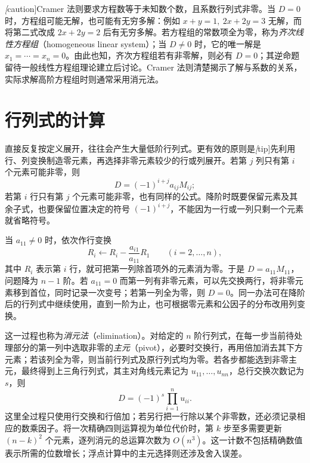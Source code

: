 \emph[caution]{Cramer 法则要求方程数等于未知数个数，且系数行列式非零}。当 $D=0$ 时，方程组可能无解，也可能有无穷多解：例如 $x+y=1,\ 2x+2y=3$ 无解，而将第二式改成 $2x+2y=2$ 后有无穷多解。若方程组的常数项全为零，称为\emph{齐次线性方程组}（homogeneous linear system）；当 $D\ne0$ 时，它的唯一解是 $x_1=\cdots=x_n=0$。由此也知，齐次方程组若有非零解，则必有 $D=0$；其逆命题留待一般线性方程组理论建立后讨论。Cramer 法则清楚揭示了解与系数的关系，实际求解高阶方程组时则通常采用消元法。

\section{行列式的计算}
\label{sec:determinant-computation}

直接反复按定义展开，往往会产生大量低阶行列式。更有效的原则是\emph[tip]{先利用行、列变换制造零元素，再选择非零元素较少的行或列展开}。若第 $j$ 列只有第 $i$ 个元素可能非零，则
\[
    D=(-1)^{i+j}a_{ij}M_{ij};
\]
若第 $i$ 行只有第 $j$ 个元素可能非零，也有同样的公式。降阶时既要保留元素及其余子式，也要保留位置决定的符号 $(-1)^{i+j}$，不能因为一行或一列只剩一个元素就省略符号。

当 $a_{11}\ne0$ 时，依次作行变换
\[
    R_i\longleftarrow R_i-\frac{a_{i1}}{a_{11}}R_1
    \qquad(i=2,\ldots,n),
\]
其中 $R_i$ 表示第 $i$ 行，就可把第一列除首项外的元素消为零。于是 $D=a_{11}M_{11}$，问题降为 $n-1$ 阶。若 $a_{11}=0$ 而第一列有非零元素，可以先交换两行，将非零元素移到首位，同时记录一次变号；若第一列全为零，则 $D=0$。同一办法可在降阶后的行列式中继续使用，直到一阶为止，也可根据零元素和公因子的分布改用列变换。

这一过程也称为\emph{消元法}（elimination）。对给定的 $n$ 阶行列式，在每一步当前待处理部分的第一列中选取非零的\emph{主元}（pivot），必要时交换行，再用倍加消去其下方元素；若该列全为零，则当前行列式及原行列式均为零。若各步都能选到非零主元，最终得到上三角行列式，其主对角线元素记为 $u_{11},\ldots,u_{nn}$，总行交换次数记为 $s$，则
\begin{equation}
\label{eq:determinant-elimination-product}
    D=(-1)^s\prod_{i=1}^{n}u_{ii}.
\end{equation}
这里全过程只使用行交换和行倍加；若另行把一行除以某个非零数，还必须记录相应的数乘因子。将一次精确四则运算视为单位代价时，第 $k$ 步至多需要更新 $(n-k)^2$ 个元素，逐列消元的总运算次数为 $O(n^3)$。这一计数不包括精确数值表示所需的位数增长；浮点计算中的主元选择则还涉及舍入误差。

